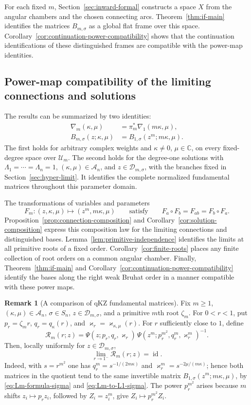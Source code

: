 \documentclass[12pt]{amsart}
\theoremstyle{definition}
\numberwithin{equation}{section}
\theoremstyle{definition}
\newtheorem*{rem}{Remark}
\let\mc\mathcal
\let\ka\kappa
\let\La\Lambda
\let\si\sigma
\let\ge\geqslant
\let\on\operatorname
\def\C{{\mathbb C}}
\def\id{\on{id}}
\def\beq{\begin{equation}}
\def\eeq{\end{equation}}
\begin{document}
For each fixed $m$, Section~\ref{sec:inward-formal} constructs
a space $X$ from the angular chambers and the chosen connecting
arcs. Theorem~\ref{thm:if-main} identifies the matrices
$B_{m,\si}$ as a global flat frame over this space.
Corollary~\ref{cor:continuation-power-compatibility} shows that
the continuation identifications of these distinguished frames
are compatible with the power-map identities.

\subsection{Power-map compatibility of the limiting connections and solutions}
\label{subsec:habiro-type}

The results can be summarized by two identities:
\beq\label{eq:functorial-summary}
 \boxed{\quad
 \begin{aligned}
 \nabla_m(\ka,\mu)&=\pi_m^*\nabla_1(m\ka,\mu),\\
 B_{m,\si}(z;\ka,\mu)&=B_{1,\si}(z^m;m\ka,\mu).
 \end{aligned}
 \quad}
\eeq
The first holds for arbitrary complex weights and
$\ka\ne0$, $\mu\in\C$, on every fixed-degree space over
$\mc U_m$. The second holds for the degree-one solutions with
$\La_1=\cdots=\La_n=1$, $(\ka,\mu)\in\mc A_n$, and
$z\in\mc D_{m,\si}$, with the branches fixed in Section~\ref{sec:hyper-limit}.
It identifies the complete normalized fundamental matrices
throughout this parameter domain.

The transformations of variables and parameters
\beq\label{eq:power-parameter-functoriality}
 F_m:(z,\ka,\mu)\longmapsto(z^m,m\ka,\mu)
 \qquad\text{satisfy}\qquad
 F_a\circ F_b=F_{ab}=F_b\circ F_a.
\eeq
Proposition~\ref{prop:connection-composition} and
Corollary~\ref{cor:solution-composition} express this composition
law for the limiting connections and distinguished bases.
Lemma~\ref{lem:primitive-independence} identifies the limits
at all primitive roots of a fixed order.
Corollary~\ref{cor:finite-roots} places any finite collection
of root orders on a common angular chamber. Finally,
Theorem~\ref{thm:if-main} and
Corollary~\ref{cor:continuation-power-compatibility} identify
the bases along the right weak Bruhat order in a manner
compatible with these power maps.

\begin{rem}[A comparison of qKZ fundamental matrices]
Fix $m\ge1$, $(\ka,\mu)\in\mc A_n$, $\si\in S_n$,
$z\in\mc D_{m,\si}$, and a primitive $m$th root $\zeta_m$.
For $0<r<1$, put $p_r=\zeta_m r$, $q_r=q_\ka(r)$, and
$\varkappa_r=\varkappa_{\ka,\mu}(r)$. For $r$ sufficiently
close to $1$, define
\[
 \mc R_m(r;z)=
 \Psi(z;p_r,q_r,\varkappa_r)\,
 \Psi(z^m;p_r^{m^2},q_r^m,\varkappa_r^m)^{-1}.
\]
Then, locally uniformly for $z\in\mc D_{m,\si}$,
\[
 \lim_{r\to1^-}\mc R_m(r;z)=\id.
\]
Indeed, with $s=r^{m^2}$ one has
$q_r^m=s^{-1/(2m\ka)}$ and
$\varkappa_r^m=s^{-2\mu/(m\ka)}$; hence both
matrices in the quotient tend to the same invertible matrix
$B_{1,\si}(z^m;m\ka,\mu)$, by
\eqref{eq:Lm-formula-sigma} and \eqref{eq:Lm-to-L1-sigma}.
The power $p_r^{m^2}$ arises because $m$ shifts
$z_i\mapsto p_rz_i$, followed by $Z_i=z_i^m$,
give $Z_i\mapsto p_r^{m^2}Z_i$.
\end{rem}
\end{document}
